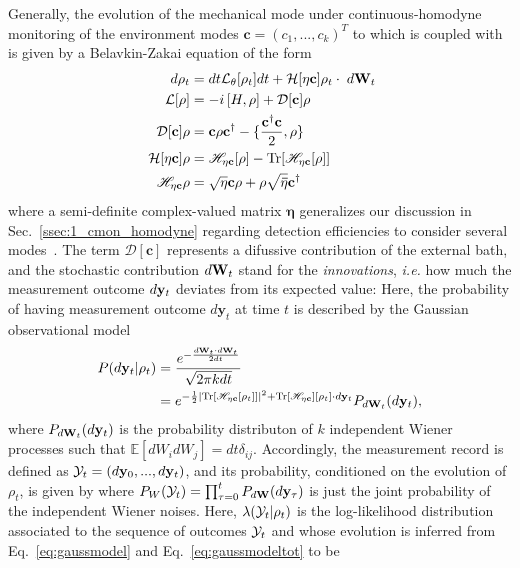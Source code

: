 Generally, the evolution of the mechanical mode under continuous-homodyne monitoring of the environment modes $\mathbf{c} = (c_1,...,c_k)^T$ to which is coupled with is given by a Belavkin-Zakai equation of the form
\begin{align}\label{eq:CMON_BELAVKIN}
d\rho_t &= dt \mathcal{L}_\theta[\rho_t] dt + \Hec \rho_t \cdot \;\dwt\\
\mathcal{L}[\rho] &= -\ii \Comm{H}{\rho} + \mathcal{D}[\mathbf{c}] \rho\\
\mathcal{D}[\mathbf{c}]\rho &= \mathbf{c}\rho \mathbf{c}^\dagger - \llaves{\frac{\mathbf{c}^\dagger \mathbf{c}}{2},\rho} \\ \nonumber
\Hec \rho &= \hec[\rho] - \tr{ \hec[\rho] }\\ \nonumber
\hec \rho &= \sqrt{\mathbf{\eta}}\mathbf{c}\rho + \rho \sqrt{\mathbf{\bar{\eta}}}\mathbf{c}^\dagger \nonumber
\end{align}
where a semi-definite complex-valued matrix $\mathbf{\eta}$ generalizes our discussion in Sec.~\ref{ssec:1_cmon_homodyne} regarding detection efficiencies to consider several modes~\cite{Wiseman2005optimal,wisemanbook}. The term $\mathcal{D}[\mathbf{c}]$ represents a difussive contribution of the external bath, and the stochastic contribution $d\mathbf{W}_t$ stand for the \textit{innovations}, \textit{i.e.} how much the measurement outcome $d\mathbf{y}_t$ deviates from its expected value:
Here, the probability of having measurement outcome $d\mathbf{y}_t$ at time $t$ is described by the Gaussian observational model
\begin{align}\label{eq:gaussmodel}
P(d\mathbf{y}_t|\rho_t) &= \frac{e^{-\frac{d\mathbf{W}_t\cdot d\mathbf{W}_t}{2 dt}}}{\sqrt{2 \pi k dt}} \\
&= e^{-\frac{1}{2} |\text{Tr}[\mathscr{H}_{\mathbf{\eta}\mathbf{c}}[\rho_t]]|^2 + \text{Tr}[\mathscr{H}_{\mathbf{\eta}\mathbf{c}}][\rho_t]\cdot d\mathbf{y}_t} P_{d\mathbf{W}_t}(d\mathbf{y}_t),
\end{align}
where $P_{d\mathbf{W}_t}(d\mathbf{y}_t)$ is the probability distributon of $k$ independent Wiener processes such that $\mathbb{E}[dW_i dW_j] = dt \delta_{ij}$. Accordingly, the measurement record is defined as $\mathcal{Y}_t = (d\mathbf{y}_0, ... ,d\mathbf{y}_t)$, and its probability, conditioned on the evolution of $\rho_t$, is given by
where $P_W(\mathcal{Y}_t) = \prod_{\tau=0}^tP_{d\mathbf{W}}(d\mathbf{y}_\tau)$ is just the joint probability of the independent Wiener noises. Here, $\lambda(\mathcal{Y}_t|\rho_t)$ is the log-likelihood distribution associated to the sequence of outcomes $\mathcal{Y}_t$ and whose evolution is inferred from Eq.~\ref{eq:gaussmodel} and Eq.~\ref{eq:gaussmodeltot} to be
